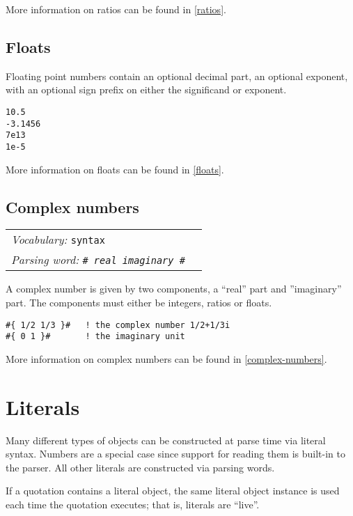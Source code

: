 \documentclass{book}
\newcommand{\tto}{\symbol{123}}
\newcommand{\ttc}{\symbol{125}}
\newcommand{\pound}{\char'43}
\newcommand{\vocabulary}[1]{\emph{Vocabulary:} \texttt{#1}&\\}
\newcommand{\parsingword}[2]{\index{\texttt{#1}}\emph{Parsing word:} \texttt{#2}&\\}
\newcommand{\wordtable}[1]{


\begin{tabularx}{12cm}{lX}
\hline
#1
\hline
\end{tabularx}

}
\begin{document}
More information on ratios can be found in \ref{ratios}.

\subsection{Floats}\label{float-literals}

\newcommand{\floatglos}{}
\floatglos

Floating point numbers contain an optional decimal part, an optional exponent, with
an optional sign prefix on either the significand or exponent.
\begin{alltt}
10.5
-3.1456
7e13
1e-5
\end{alltt}

More information on floats can be found in \ref{floats}.

\subsection{Complex numbers}\label{complex-literals}

\newcommand{\complexglos}{}
\complexglos
\wordtable{
\vocabulary{syntax}
\parsingword{\pound\tto}{\#\tto{} \emph{real} \emph{imaginary} \ttc\#}
}
A complex number
is given by two components, a ``real'' part and ''imaginary'' part. The components
must either be integers, ratios or floats.
\begin{verbatim}
#{ 1/2 1/3 }#   ! the complex number 1/2+1/3i
#{ 0 1 }#       ! the imaginary unit
\end{verbatim}

More information on complex numbers can be found in \ref{complex-numbers}.

\section{Literals}

Many different types of objects can be constructed at parse time via literal syntax. Numbers are a special case since support for reading them is built-in to the parser. All other literals are constructed via parsing words.

If a quotation contains a literal object, the same literal object instance is used each time the quotation executes; that is, literals are ``live''.
\end{document}
